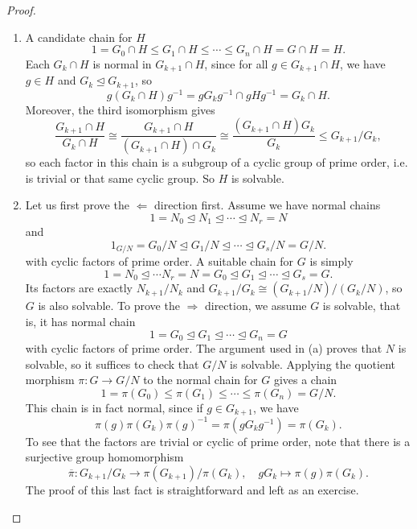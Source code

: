 \begin{proof} ~
    \begin{enumerate}[label=(\alph*)]
        \item A candidate chain for $H$
        \[
            1 = G_0 \cap H \leq G_1 \cap H \leq \cdots \leq G_n \cap H = G \cap H = H.
        \]
        Each $G_k \cap H$ is normal in $G_{k + 1} \cap H$, since for all $g \in G_{k + 1} \cap H$, we have $g \in H$ and $G_k \unlhd G_{k + 1}$, so
        \[
            g(G_k \cap H)g^{-1} = gG_kg^{-1} \cap gHg^{-1} = G_k \cap H.
        \]
        Moreover, the third isomorphism gives
        \[
            \frac{G_{k + 1} \cap H}{G_k \cap H} \cong \frac{G_{k + 1} \cap H}{(G_{k + 1} \cap H) \cap G_k} \cong \frac{(G_{k + 1} \cap H) G_k}{G_k} \leq G_{k + 1}/G_k,
        \]
        so each factor in this chain is a subgroup of a cyclic group of prime order, i.e. is trivial or that same cyclic group. So $H$ is solvable.
        
        \item Let us first prove the $\Leftarrow$ direction first. Assume we have normal chains
        \[
            1 = N_0 \unlhd N_1 \unlhd \cdots \unlhd N_r = N
        \]
        and
        \[
            1_{G/N} = G_0/N \unlhd G_1/N \unlhd \cdots \unlhd G_s/N = G/N.
        \]
        with cyclic factors of prime order. A suitable chain for $G$ is simply
        \[
            1 = N_0 \unlhd \cdots N_r = N = G_0 \unlhd G_1 \unlhd \cdots \unlhd G_s = G.
        \]
        Its factors are exactly $N_{k + 1}/N_k$ and $G_{k + 1}/G_k \cong (G_{k + 1}/N)/(G_{k}/N)$, so $G$ is also solvable. To prove the $\Rightarrow$ direction, we assume $G$ is solvable, that is, it has normal chain
        \[
            1 = G_0 \unlhd G_1 \unlhd \cdots \unlhd G_n = G
        \]
        with cyclic factors of prime order. The argument used in (a) proves that $N$ is solvable, so it suffices to check that $G/N$ is solvable. Applying the quotient morphism $\pi: G \to G/N$ to the normal chain for $G$ gives a chain
        \[
            1 = \pi(G_0) \leq \pi(G_1) \leq \cdots \leq \pi(G_n) = G/N.
        \]
        This chain is in fact normal, since if $g \in G_{k + 1}$, we have
        \[
            \pi(g) \pi(G_k) \pi(g)^{-1} = \pi(gG_kg^{-1}) = \pi(G_k).
        \]
        To see that the factors are trivial or cyclic of prime order, note that there is a surjective group homomorphism
        \[
            \overline{\pi}: G_{k + 1}/G_k \to \pi(G_{k + 1})/\pi(G_k), \quad gG_{k} \longmapsto \pi(g)\pi(G_k).
        \]
        The proof of this last fact is straightforward and left as an exercise. \qedhere
    \end{enumerate}
\end{proof}


